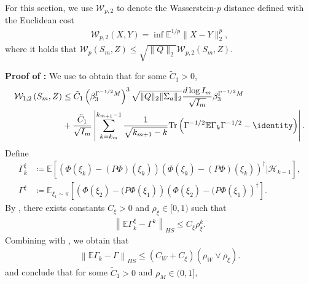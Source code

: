 \documentclass[11pt]{article}
\begin{document}
For this section, we use $\mathcal{W}_{p, 2}$ to denote the Wasserstein-$p$ distance defined with the Euclidean cost
\begin{align*}
    \mathcal{W}_{p, 2}(X, Y) = \inf \mathbb{E}^{1/p} \lVert X - Y \rVert_{2}^p , 
\end{align*}
where it holds that $\mathcal{W}_p(S_m, Z) \leq \sqrt{\lVert Q \rVert_2} \mathcal{W}_{p, 2} (S_m, Z)$. 







\textbf{Proof of :}
We use \citep[Theorem 1]{srikant2024CLT} to obtain that for some $\tilde{C}_1 > 0$,
\begin{equation}\label{eq:thm1_srikant}
\begin{split}
    \mathcal{W}_{1, 2} \left( 
        S_m, Z
    \right)
    &\leq 
    \tilde{C}_1 \left(\beta_3^{\Gamma^{-1/2} M} \right)^3 \sqrt{\lVert Q \rVert_2 \lVert \Sigma_a \rVert_2} \frac{d \log I_m}{\sqrt{I_m}} \beta_3^{\Gamma^{-1/2} M}     
    \\ & + 
    \frac{\tilde{C}_1}{\sqrt{I_m}} \left\lvert 
    \sum_{k=k_m}^{k_{m+1} - 1} \frac{1}{\sqrt{k_{m+1} - k}}
  \mathrm{Tr} \left( \Gamma^{-1/2}\mathbb{E}\Gamma_k \Gamma^{-1/2} - \identity \right)  \right\rvert
.    
\end{split}
\end{equation}
Define
\begin{align*}
    \Gamma^\xi_k &\coloneqq \mathbb{E}\left[ \left(\Phi(\xi_k) - (P \Phi)(\xi_k) \right)  \left(\Phi(\xi_k) - (P \Phi)(\xi_k) \right)^\dagger \Big| \mathcal{H}_{k-1}  \right],
    \\
    \Gamma^\xi &\coloneqq \mathbb{E}_{\xi_1 \sim \pi} \left[ \left(\Phi(\xi_2) - (P \Phi(\xi_{1}) \right) \left(\Phi(\xi_2) - (P \Phi(\xi_{1}) \right)^\dagger \right]. 
\end{align*}
By \citep[Theorem 3]{srikant2024CLT}, there exists constants $C_\xi > 0$ and $\rho_\xi \in [0, 1)$ such that 
\begin{align*}
    \left\| \mathbb{E}\Gamma_k^\xi - \Gamma^k \right\|_{HS} \leq C_\xi \rho_\xi^k.
\end{align*}
Combining with , we obtain that
\begin{align*}
    \left\| \mathbb{E}\Gamma_k - \Gamma \right\|_{HS} \leq 
    \left( C_W + C_\xi\right) \left( \rho_W \vee \rho_\xi \right)
    .
\end{align*}
and conclude that for some $\tilde{C}_1 > 0$ and $\rho_M \in (0, 1]$, 
\end{document}
